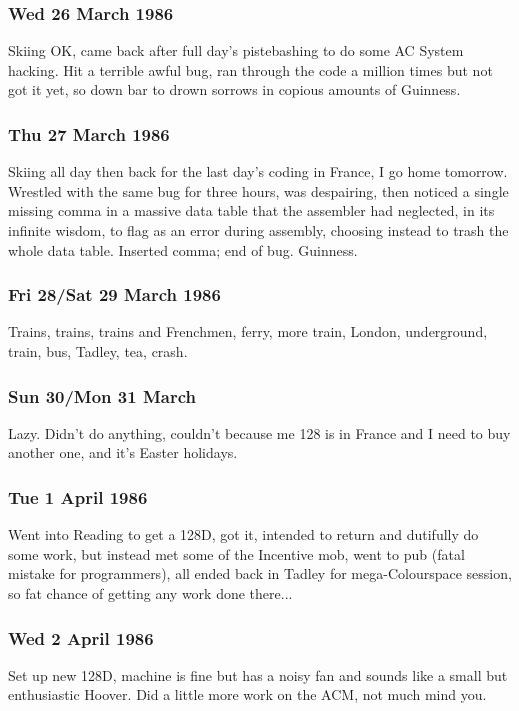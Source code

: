 \subsubsection{Wed 26 March 1986}
Skiing OK, came back after full day's pistebashing to do some AC System hacking. Hit a terrible awful bug, ran through the code a million times but not got it yet, so down bar to drown sorrows in copious amounts of Guinness.

\subsubsection{Thu 27 March 1986}
Skiing all day then back for the last day's coding in France, I go home tomorrow. Wrestled with the same bug for three hours, was despairing, then noticed a single missing comma in a massive data table that the assembler had neglected, in its infinite wisdom, to flag as an error during assembly, choosing instead to trash the whole data table. Inserted comma; end of bug. Guinness.

\subsubsection{Fri 28/Sat 29 March 1986}
Trains, trains, trains and Frenchmen, ferry, more train, London, underground, train, bus, Tadley, tea, crash.

\subsubsection{Sun 30/Mon 31 March}
Lazy. Didn't do anything, couldn't because me 128 is in France and I need to buy another one, and it's Easter holidays.

\subsubsection{Tue 1 April 1986}
Went into Reading to get a 128D, got it, intended to return and dutifully do some work, but instead met some of the Incentive mob, went to pub (fatal mistake for programmers), all ended back in Tadley for mega-Colourspace session, so fat chance of getting any work done there...

\subsubsection{Wed 2 April 1986}
Set up new 128D, machine is fine but has a noisy fan and sounds like a small but enthusiastic Hoover. Did a little more work on the ACM, not much mind you.

